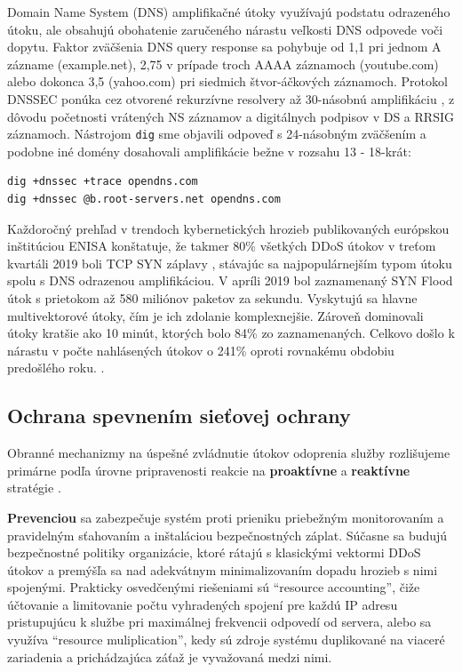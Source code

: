\documentclass[12pt, a4paper]{article}
\begin{document}
Domain Name System (DNS) amplifikačné útoky využívajú podstatu odrazeného útoku, ale obsahujú obohatenie
zaručeného nárastu veľkosti DNS odpovede voči dopytu. Faktor zväčšenia DNS query response sa pohybuje
od 1,1 pri jednom A zázname (example.net), 2,75 v prípade troch AAAA záznamoch (youtube.com) alebo 
dokonca 3,5 (yahoo.com) pri siedmich štvor-áčkových záznamoch. Protokol DNSSEC ponúka
cez otvorené rekurzívne resolvery až 30-násobnú amplifikáciu \cite{csirt-ddos}, 
z dôvodu početnosti vrátených NS záznamov a digitálnych podpisov v DS a RRSIG záznamoch. 
Nástrojom \verb|dig| sme objavili odpoveď s 24-násobným zväčšením a podobne iné domény dosahovali
amplifikácie bežne v rozsahu 13 - 18-krát:
\begin{lstlisting}
dig +dnssec +trace opendns.com
dig +dnssec @b.root-servers.net opendns.com
\end{lstlisting}

Každoročný prehľad v trendoch kybernetických hrozieb publikovaných európskou inštitúciou ENISA
konštatuje, že takmer 80\% všetkých DDoS útokov v treťom kvartáli 2019 boli TCP SYN záplavy 
\cite{enisa-ddos}, stávajúc sa najpopulárnejším typom útoku spolu s DNS odrazenou amplifikáciou. 
V apríli 2019 bol zaznamenaný SYN Flood útok s prietokom až 580 miliónov paketov za sekundu. Vyskytujú
sa hlavne multivektorové útoky, čím je ich zdolanie komplexnejšie. Zároveň dominovali útoky kratšie
ako 10 minút, ktorých bolo 84\% zo zaznamenaných. Celkovo došlo k nárastu v počte nahlásených útokov
o 241\% oproti rovnakému obdobiu predošlého roku. \cite{enisa-ddos}.

\subsection{Ochrana spevnením sieťovej ochrany}
Obranné mechanizmy na úspešné zvládnutie útokov odoprenia služby rozlišujeme primárne podľa
úrovne pripravenosti reakcie na \textbf{proaktívne} a \textbf{reaktívne} stratégie
\cite{ddos-anatomy-2004}.

\textbf{Prevenciou} sa zabezpečuje systém proti prieniku priebežným monitorovaním
a pravidelným sťahovaním a inštaláciou bezpečnostných záplat. Súčasne sa budujú
bezpečnostné politiky organizácie, ktoré rátajú s klasickými vektormi DDoS útokov a premýšľa sa 
nad adekvátnym minimalizovaním dopadu hrozieb s nimi spojenými. Prakticky osvedčenými 
riešeniami sú \enquote{resource accounting}, čiže účtovanie a limitovanie počtu vyhradených spojení 
pre každú IP adresu pristupujúcu k službe pri maximálnej frekvencii odpovedí od servera, alebo sa využíva 
\enquote{resource muliplication}, kedy sú zdroje systému duplikované na viaceré zariadenia a prichádzajúca 
záťaž je vyvažovaná medzi nimi.
\end{document}
